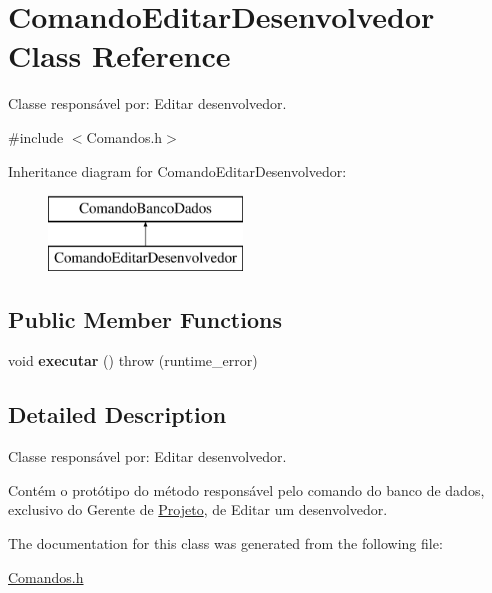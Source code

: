 \hypertarget{class_comando_editar_desenvolvedor}{}\section{Comando\+Editar\+Desenvolvedor Class Reference}
\label{class_comando_editar_desenvolvedor}


Classe responsável por\+: Editar desenvolvedor.  




{\ttfamily \#include $<$Comandos.\+h$>$}

Inheritance diagram for Comando\+Editar\+Desenvolvedor\+:\begin{figure}[H]
\begin{center}
\leavevmode
\includegraphics[height=2.000000cm]{class_comando_editar_desenvolvedor}
\end{center}
\end{figure}
\subsection*{Public Member Functions}
\begin{DoxyCompactItemize}
\item 
\hypertarget{class_comando_editar_desenvolvedor_ae4949af13a1df3694b1a4fea59064326}{}\label{class_comando_editar_desenvolvedor_ae4949af13a1df3694b1a4fea59064326} 
void {\bfseries executar} ()  throw (runtime\+\_\+error)
\end{DoxyCompactItemize}


\subsection{Detailed Description}
Classe responsável por\+: Editar desenvolvedor. 

Contém o protótipo do método responsável pelo comando do banco de dados, exclusivo do Gerente de \hyperlink{class_projeto}{Projeto}, de Editar um desenvolvedor. 

The documentation for this class was generated from the following file\+:\begin{DoxyCompactItemize}
\item 
\hyperlink{_comandos_8h}{Comandos.\+h}\end{DoxyCompactItemize}
